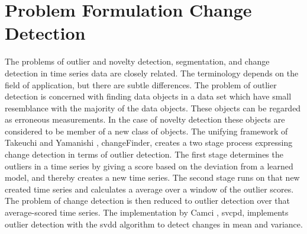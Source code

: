 \section{Problem Formulation Change Detection}\label{sec:change_detection_time_series}

The problems of outlier and novelty detection, segmentation, and change detection in time series data are closely related.
The terminology depends on the field of application, but there are subtle differences.
The problem of outlier detection is concerned with finding data objects in a data set which have small resemblance with the majority of the data objects.
These objects can be regarded as erroneous measurements.
In the case of novelty detection these objects are considered to be member of a new class of objects.
The unifying framework of Takeuchi and Yamanishi \cite{takeuchi2006unifying}, \gls{changeFinder}, creates a two stage process expressing change detection in terms of outlier detection.
The first stage determines the outliers in a time series by giving a score based on the deviation from a learned model, and thereby creates a new time series.
The second stage runs on that new created time series and calculates a average over a window of the outlier scores.
The problem of change detection is then reduced to outlier detection over that average-scored time series.
The implementation by Camci \cite{camci2010change}, \gls{svcpd}, implements outlier detection with the \gls{svdd} algorithm to detect changes in mean and variance.


